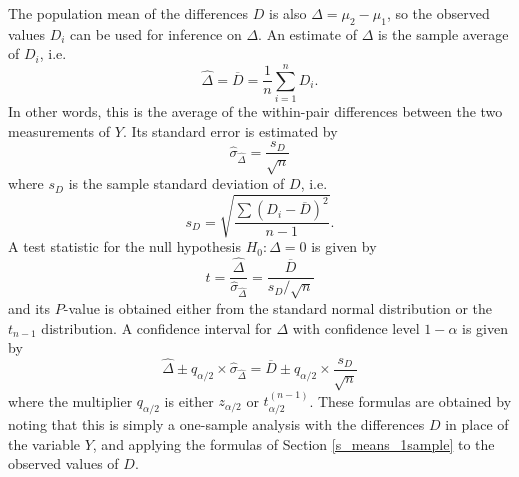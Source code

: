 The population mean of the differences $D$ is also
$\Delta=\mu_{2}-\mu_{1}$, so the observed values $D_{i}$ can be used for
inference on $\Delta$. An estimate of $\Delta$ is the sample
average of $D_{i}$, i.e.\
\begin{equation}
\hat{\Delta}=\overline{D}=\frac{1}{n}\sum_{i=1}^{n} D_{i}.
\label{Dbar_dep}
\end{equation}
In other words, this is the average of the within-pair differences
between the two measurements of $Y$.
Its standard error is estimated by
\begin{equation}
\hat{\sigma}_{\hat{\Delta}} =
\frac{s_{D}}{\sqrt{n}}
\label{sDbar_dep}
\end{equation}
where $s_{D}$ is the sample standard deviation of $D$, i.e.\
\begin{equation}
s_{D} = \sqrt{\frac{\sum (D_{i}-\overline{D})^{2}}{n-1}}.
\label{s2D_dep}
\end{equation}
A test statistic for the null hypothesis $H_{0}: \Delta=0$
is given by
\begin{equation}
t=
\frac{\hat{\Delta}}{\hat{\sigma}_{\hat{\Delta}}}=
\frac{\overline{D}}{s_{D}/\sqrt{n}}
\label{zD_dep}
\end{equation}
and its $P$-value is obtained either from the standard normal
distribution or the $t_{n-1}$ distribution.
A confidence interval for $\Delta$ with confidence level $1-\alpha$
is given by
\begin{equation}
\hat{\Delta} \pm q_{\alpha/2} \times \hat{\sigma}_{\hat{\Delta}}
=\overline{D} \pm q_{\alpha/2} \times \frac{s_{D}}{\sqrt{n}}
\label{ciD_dep}
\end{equation}
where the multiplier $q_{\alpha/2}$ is either $z_{\alpha/2}$ or
$t_{\alpha/2}^{(n-1)}$. These formulas are obtained by noting
that this is simply a one-sample analysis
with the differences $D$ in place of the variable $Y$,
and applying the formulas of Section
\ref{s_means_1sample} to the observed values of $D$.


